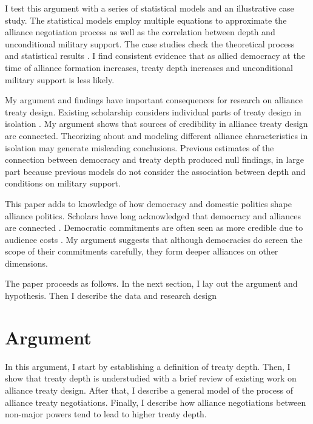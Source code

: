\documentclass[12pt]{article}
\begin{document}
I test this argument with a series of statistical models and an illustrative case study.
The statistical models employ multiple equations to approximate the alliance negotiation process as well as the correlation between depth and unconditional military support. 
The case studies check the theoretical process and statistical results \citep{SeawrightGerring2008, Seawright2016}. 
I find consistent evidence that as allied democracy at the time of alliance formation increases, treaty depth increases and unconditional military support is less likely. 


My argument and findings have important consequences for research on alliance treaty design. 
Existing scholarship considers individual parts of treaty design in isolation \citep{Benson2012, Mattes2012, Chibaetal2015}. 
My argument shows that sources of credibility in alliance treaty design are connected. 
Theorizing about and modeling different alliance characteristics in isolation may generate misleading conclusions. 
Previous estimates of the connection between democracy and treaty depth produced null findings, in large part because previous models do not consider the association between depth and conditions on military support. 


This paper adds to knowledge of how democracy and domestic politics shape alliance politics. 
Scholars have long acknowledged that democracy and alliances are connected \citep{LaiReiter2000, GiblerWolford2006, Warren2016, McManusYarhi-Milo2017}. 
Democratic commitments are often seen as more credible due to audience costs \citep{DigiuseppePoast2016}. 
My argument suggests that although democracies do screen the scope of their commitments carefully, they form deeper alliances on other dimensions.  


The paper proceeds as follows. 
In the next section, I lay out the argument and hypothesis. 
Then I describe the data and research design 


\section{Argument}


In this argument, I start by establishing a definition of treaty depth. 
Then, I show that treaty depth is understudied with a brief review of existing work on alliance treaty design. 
After that, I describe a general model of the process of alliance treaty negotiations. 
Finally, I describe how alliance negotiations between non-major powers tend to lead to higher treaty depth. 
\end{document}
